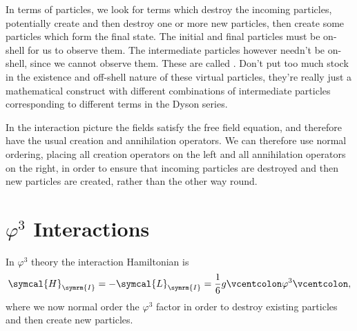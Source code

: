 \documentclass[fleqn]{NotesClass}
\newcommand{\lagrangianDensity}{\symcal{L}}
\newcommand{\hamiltonianDensity}{\symcal{H}}
\newcommand{\normalordering}[1]{{\vcentcolon}{#1}{\vcentcolon}}
\newcommand{\interaction}{\symrm{I}}
\begin{document}
    In terms of particles, we look for terms which destroy the incoming particles, potentially create and then destroy one or more new particles, then create some particles which form the final state.
    The initial and final particles must be on-shell for us to observe them.
    The intermediate particles however needn't be on-shell, since we cannot observe them.
    These are called .
    Don't put too much stock in the existence and off-shell nature of these virtual particles, they're really just a mathematical construct with different combinations of intermediate particles corresponding to different terms in the Dyson series.
    
    In the interaction picture the fields satisfy the free field equation, and therefore have the usual creation and annihilation operators.
    We can therefore use normal ordering, placing all creation operators on the left and all annihilation operators on the right, in order to ensure that incoming particles are destroyed and then new particles are created, rather than the other way round.
    
    \section{\texorpdfstring{\(\varphi^3\)}{Phi Cubed} Interactions}
    In \(\varphi^3\) theory the interaction Hamiltonian is
    \begin{equation}
        \hamiltonianDensity_{\interaction} = -\lagrangianDensity_{\interaction} = \frac{1}{6}g\normalordering{\varphi^3},
    \end{equation}
    where we now normal order the \(\varphi^3\) factor in order to destroy existing particles and then create new particles.
    
\end{document}
